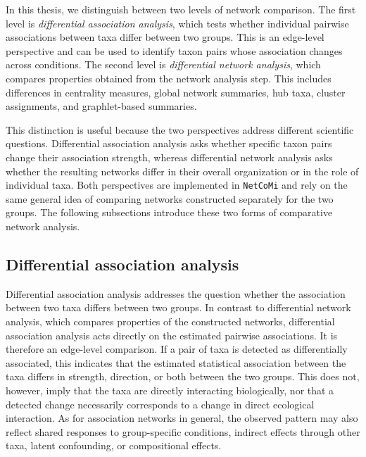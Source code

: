 In this thesis, we distinguish between two levels of network comparison. The first level is \emph{differential association analysis}, which tests whether individual pairwise associations between taxa differ between two groups. This is an edge-level perspective and can be used to identify taxon pairs whose association changes across conditions. The second level is \emph{differential network analysis}, which compares properties obtained from the network analysis step. This includes differences in centrality measures, global network summaries, hub taxa, cluster assignments, and graphlet-based summaries.

This distinction is useful because the two perspectives address different scientific questions. Differential association analysis asks whether specific taxon pairs change their association strength, whereas differential network analysis asks whether the resulting networks differ in their overall organization or in the role of individual taxa. Both perspectives are implemented in \texttt{NetCoMi} and rely on the same general idea of comparing networks constructed separately for the two groups. The following subsections introduce these two forms of comparative network analysis.


\subsection{Differential association analysis}
\label{sec:5net:net_comparison:differential_association}

Differential association analysis addresses the question whether the association between two taxa differs between two groups. In contrast to differential network analysis, which compares properties of the constructed networks, differential association analysis acts directly on the estimated pairwise associations. It is therefore an edge-level comparison. If a pair of taxa is detected as differentially associated, this indicates that the estimated statistical association between the taxa differs in strength, direction, or both between the two groups. This does not, however, imply that the taxa are directly interacting biologically, nor that a detected change necessarily corresponds to a change in direct ecological interaction. As for association networks in general, the observed pattern may also reflect shared responses to group-specific conditions, indirect effects through other taxa, latent confounding, or compositional effects.

